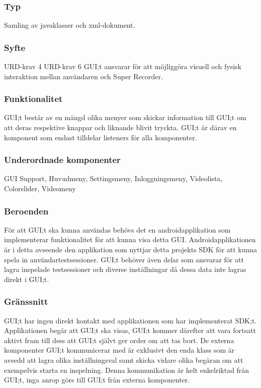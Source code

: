 \subsubsection{Typ}
Samling av javaklasser och xml-dokument.
\subsubsection{Syfte}
URD-krav 4
URD-krav 6
GUI;t ansvarar för att möjliggöra visuell och fysisk interaktion mellan användaren och Super Recorder. 

\subsubsection{Funktionalitet}
GUI;t består av en mängd olika menyer som skickar information till GUI;t om att deras respektive knappar och liknande blivit tryckta. GUI;t är därav en komponent som endast tilldelar listeners för alla komponenter.

\subsubsection{Underordnade komponenter}
GUI Support, Huvudmeny, Settingsmeny, Inloggningsmeny, Videolista, Colorslider, Videomeny

\subsubsection{Beroenden}
För att GUI;t ska kunna användas behövs det en androidapplikation som implementerar funktionalitet för att kunna visa detta GUI. Androidapplikationen är i detta avseende den applikation som nyttjar detta projekts SDK för att kunna spela in användartestsessioner. GUI;t behöver även delar som ansvarar för att lagra inspelade testsessioner och diverse inställningar då dessa data inte lagras direkt i GUI;t.

\subsubsection{Gränssnitt}
GUI;t har ingen direkt kontakt med applikationen som har implementerat SDK;t. Applikationen begär att GUI;t ska visas, GUI;t kommer därefter att vara fortsatt aktivt fram till dess att GUI;t självt ger order om att tas bort. De externa komponenter GUI;t kommunicerar med är exklusivt den enda klass som är avsedd att lagra olika inställningsval samt skicka vidare olika begäran om att exempelvis starta en inspelning. Denna kommunikation är helt enkelriktad från GUI;t, inga anrop görs till GUI;t från externa komponenter. 

